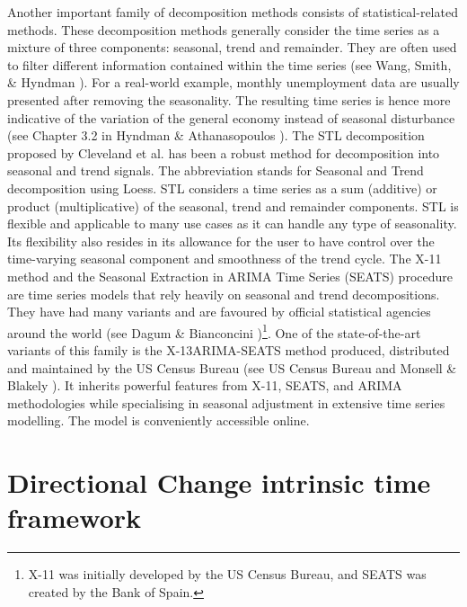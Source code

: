 Another important family of decomposition methods consists of statistical-related methods. These decomposition methods generally consider the time series as a mixture of three components: seasonal, trend and remainder. They are often used to filter different information contained within the time series (see Wang, Smith, \& Hyndman \citeyear{wang2006characteristic}). For a real-world example, monthly unemployment data are usually presented after removing the seasonality. The resulting time series is hence more indicative of the variation of the general economy instead of seasonal disturbance (see Chapter 3.2 in Hyndman \& Athanasopoulos \citeyear{forecastingprincipleandpractice}). The STL decomposition proposed by Cleveland et al. \citeyear{cleveland1990stl} has been a robust method for decomposition into seasonal and trend signals. The abbreviation stands for Seasonal and Trend decomposition using Loess. STL considers a time series as a sum (additive) or product (multiplicative) of the seasonal, trend and remainder components. STL is flexible and applicable to many use cases as it can handle any type of seasonality. Its flexibility also resides in its allowance for the user to have control over the time-varying seasonal component and smoothness of the trend cycle. The X-11 method and the Seasonal Extraction in ARIMA Time Series (SEATS) procedure are time series models that rely heavily on seasonal and trend decompositions. They have had many variants and are favoured by official statistical agencies around the world (see Dagum \& Bianconcini \citeyear{dagum2016seasonal})\footnote{X-11 was initially developed by the US Census Bureau, and SEATS was created by the Bank of Spain.}. One of the state-of-the-art variants of this family is the X-13ARIMA-SEATS method produced, distributed and maintained by the US Census Bureau (see US Census Bureau \citeyear{x13arimaseatsmanual} and Monsell \& Blakely \citeyear{monsell2013x}). It inherits powerful features from X-11, SEATS, and ARIMA methodologies while specialising in seasonal adjustment in extensive time series modelling. The model is conveniently accessible online\footnotemark{}.

\section{Directional Change intrinsic time framework}\label{sec: dc}

